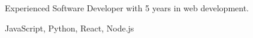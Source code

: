 \documentclass[11pt,a4paper,sans]{moderncv}
\begin{document}
\makecvtitle

Experienced Software Developer with 5 years in web development.

JavaScript, Python, React, Node.js

\end{document}
